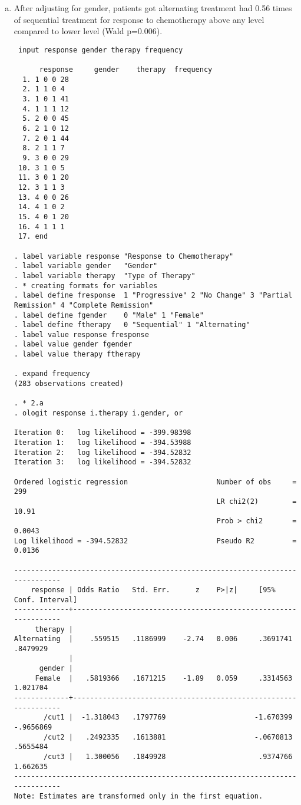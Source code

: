 \documentclass{article}
\begin{document}
\begin{enumerate}[a.]

\item After adjusting for gender, patients got alternating treatment had 0.56 times of sequential treatment for response to chemotherapy above any level compared to lower level (Wald p=0.006).

\begin{verbatim}
 input response gender therapy frequency

      response     gender    therapy  frequency
  1. 1 0 0 28
  2. 1 1 0 4
  3. 1 0 1 41
  4. 1 1 1 12
  5. 2 0 0 45
  6. 2 1 0 12
  7. 2 0 1 44
  8. 2 1 1 7
  9. 3 0 0 29
 10. 3 1 0 5
 11. 3 0 1 20
 12. 3 1 1 3
 13. 4 0 0 26
 14. 4 1 0 2
 15. 4 0 1 20
 16. 4 1 1 1
 17. end 

. label variable response "Response to Chemotherapy"
. label variable gender   "Gender"
. label variable therapy  "Type of Therapy"
. * creating formats for variables 
. label define fresponse  1 "Progressive" 2 "No Change" 3 "Partial Remission" 4 "Complete Remission"
. label define fgender    0 "Male" 1 "Female"
. label define ftherapy   0 "Sequential" 1 "Alternating"
. label value response fresponse
. label value gender fgender
. label value therapy ftherapy

. expand frequency
(283 observations created)

. * 2.a
. ologit response i.therapy i.gender, or

Iteration 0:   log likelihood = -399.98398  
Iteration 1:   log likelihood = -394.53988  
Iteration 2:   log likelihood = -394.52832  
Iteration 3:   log likelihood = -394.52832  

Ordered logistic regression                     Number of obs     =        299
                                                LR chi2(2)        =      10.91
                                                Prob > chi2       =     0.0043
Log likelihood = -394.52832                     Pseudo R2         =     0.0136

------------------------------------------------------------------------------
    response | Odds Ratio   Std. Err.      z    P>|z|     [95% Conf. Interval]
-------------+----------------------------------------------------------------
     therapy |
Alternating  |    .559515   .1186999    -2.74   0.006     .3691741    .8479929
             |
      gender |
     Female  |   .5819366   .1671215    -1.89   0.059     .3314563    1.021704
-------------+----------------------------------------------------------------
       /cut1 |  -1.318043   .1797769                     -1.670399   -.9656869
       /cut2 |   .2492335   .1613881                     -.0670813    .5655484
       /cut3 |   1.300056   .1849928                      .9374766    1.662635
------------------------------------------------------------------------------
Note: Estimates are transformed only in the first equation.


\end{verbatim}
\end{enumerate}
\end{document}
